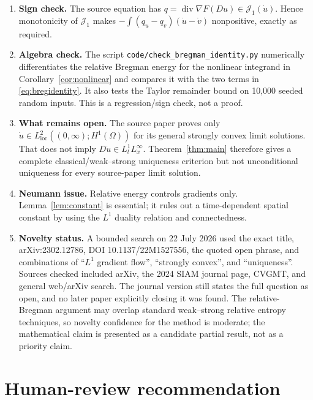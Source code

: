 \documentclass[11pt]{article}
\newcommand{\Om}{\Omega}
\newcommand{\Div}{\operatorname{div}}
\newcommand{\J}{\mathcal J_1}
\begin{document}
\begin{enumerate}
\item \textbf{Sign check.}  The source equation has
$q=\Div\nabla F(Du)\in\J(\dot u)$.  Hence monotonicity of $\J$ makes
\(-\int(q_u-q_v)(\dot u-\dot v)\) nonpositive, exactly as required.

\item \textbf{Algebra check.}  The script
\texttt{code/check\_bregman\_identity.py} numerically differentiates the
relative Bregman energy for the nonlinear integrand in
Corollary~\ref{cor:nonlinear} and compares it with the two terms in
\eqref{eq:bregidentity}.  It also tests the Taylor remainder bound on
10,000 seeded random inputs.  This is a regression/sign check, not a proof.

\item \textbf{What remains open.}  The source paper proves only
$\dot u\in L^2_{\mathrm{loc}}((0,\infty);H^1(\Om))$ for its general
strongly convex limit solutions.  That does not imply
$D\dot u\in L^1_tL^\infty_x$.  Theorem~\ref{thm:main} therefore gives a
complete classical/weak--strong uniqueness criterion but not unconditional
uniqueness for every source-paper limit solution.

\item \textbf{Neumann issue.}  Relative energy controls gradients only.
Lemma~\ref{lem:constant} is essential; it rules out a time-dependent spatial
constant by using the $L^1$ duality relation and connectedness.

\item \textbf{Novelty status.}  A bounded search on 22 July 2026 used the
exact title, arXiv:2302.12786, DOI 10.1137/22M1527556, the quoted open phrase,
and combinations of ``$L^1$ gradient flow'', ``strongly convex'', and
``uniqueness''.  Sources checked included arXiv, the 2024 SIAM journal page,
CVGMT, and general web/arXiv search.  The journal version still states the
full question as open, and no later paper explicitly closing it was found.
The relative-Bregman argument may overlap standard weak--strong relative
entropy techniques, so novelty confidence for the method is moderate; the
mathematical claim is presented as a candidate partial result, not as a
priority claim.
\end{enumerate}

\section{Human-review recommendation}
\end{document}
